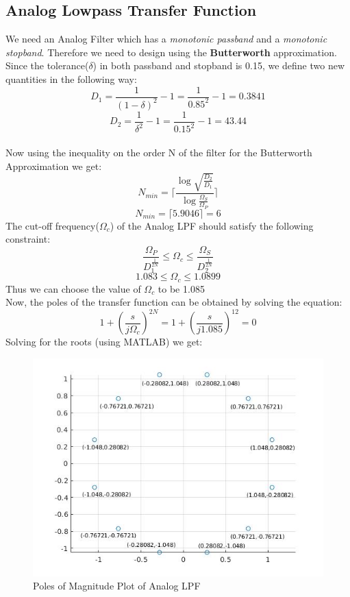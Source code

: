 \documentclass[12pt]{article}
\newcommand\ceil[1]{\lceil#1\rceil}
\begin{document}
\subsection{Analog Lowpass Transfer Function}
We need an Analog Filter which has a \textit{monotonic passband} and a \textit{monotonic stopband}. Therefore we need to design using the \textbf{Butterworth} approximation. Since the tolerance($\delta$) in both passband and stopband is 0.15, we define two new quantities in the following way:
\begin{equation*}
D_{1} =  \frac{1}{(1-\delta)^{2}} -1 = \frac{1}{0.85^{2}} -1  = 0.3841
\end{equation*}
\begin{equation*}
D_{2} = \frac{1}{\delta ^{2}} - 1 = \frac{1}{0.15^{2}} - 1 = 43.44
\end{equation*}
\\Now using the inequality on the order N of the filter for the Butterworth Approximation we get:
\begin{equation*}
N_{min} = \ceil{\frac{\log{\sqrt{\frac{D_{2}}{D_{1}}}}}{\log{\frac{\Omega_{S}}{\Omega_{P}}}}}
\end{equation*}
\begin{equation*}
N_{min} = \ceil{5.9046} = 6
\end{equation*}
The cut-off frequency($\Omega _{c}$) of the Analog LPF should satisfy the following constraint:
\begin{equation*}
\frac{\Omega_{P}}{D_{1}^{\frac{1}{2N}}} \le \Omega _{c} \le \frac{\Omega_{S}}{D_{2}^{\frac{1}{2N}}}
\end{equation*}
\begin{equation*}
1.083 \le \Omega _{c} \le 1.0899
\end{equation*}
Thus we can choose the value of $\Omega _{c}$ to be 1.085\\
Now, the poles of the transfer function can be obtained by solving the equation:
\begin{equation*}
1 + \left(\frac{s}{j\Omega _{c}}\right)^{2N} = 1 + \left(\frac{s}{j1.085}\right)^{12}  = 0
\end{equation*}
Solving for the roots (using MATLAB) we get:
\begin{figure}[h!]
	\centering	
	\includegraphics[scale = 0.7]{RootPlot2.jpg}
    \caption{Poles of Magnitude Plot of Analog LPF}
\end{figure}
\end{document}
